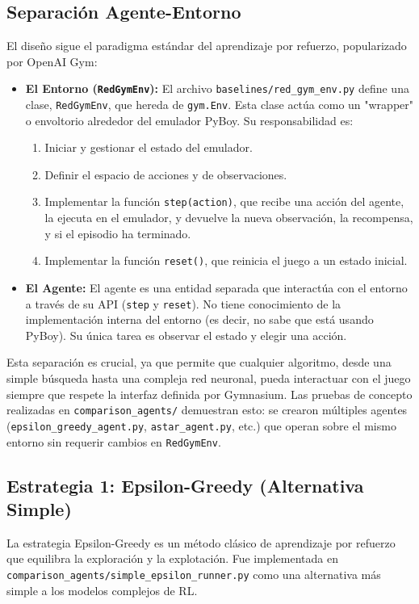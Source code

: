 \documentclass[12pt, oneside, openany]{book}
\begin{document}
\subsection{Separación Agente-Entorno}
El diseño sigue el paradigma estándar del aprendizaje por refuerzo, popularizado por OpenAI Gym:
\begin{itemize}
    \item \textbf{El Entorno (\texttt{RedGymEnv}):} El archivo \texttt{baselines/red\_gym\_env.py} define una clase, \texttt{RedGymEnv}, que hereda de \texttt{gym.Env}. Esta clase actúa como un "wrapper" o envoltorio alrededor del emulador PyBoy. Su responsabilidad es:
    \begin{enumerate}
        \item Iniciar y gestionar el estado del emulador.
        \item Definir el espacio de acciones y de observaciones.
        \item Implementar la función \texttt{step(action)}, que recibe una acción del agente, la ejecuta en el emulador, y devuelve la nueva observación, la recompensa, y si el episodio ha terminado.
        \item Implementar la función \texttt{reset()}, que reinicia el juego a un estado inicial.
    \end{enumerate}
    \item \textbf{El Agente:} El agente es una entidad separada que interactúa con el entorno a través de su API (\texttt{step} y \texttt{reset}). No tiene conocimiento de la implementación interna del entorno (es decir, no sabe que está usando PyBoy). Su única tarea es observar el estado y elegir una acción.
\end{itemize}

Esta separación es crucial, ya que permite que cualquier algoritmo, desde una simple búsqueda hasta una compleja red neuronal, pueda interactuar con el juego siempre que respete la interfaz definida por Gymnasium. Las pruebas de concepto realizadas en \texttt{comparison\_agents/} demuestran esto: se crearon múltiples agentes (\texttt{epsilon\_greedy\_agent.py}, \texttt{astar\_agent.py}, etc.) que operan sobre el mismo entorno sin requerir cambios en \texttt{RedGymEnv}.

\subsection{Estrategia 1: Epsilon-Greedy (Alternativa Simple)}
La estrategia Epsilon-Greedy es un método clásico de aprendizaje por refuerzo que equilibra la exploración y la explotación. Fue implementada en \texttt{comparison\_agents/simple\_epsilon\_runner.py} como una alternativa más simple a los modelos complejos de RL.
\end{document}
